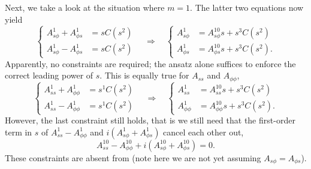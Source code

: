 Next, we take a look at the situation where $m=1$. The latter two equations now yield
\[
\left\{\begin{aligned}
    A_{s\phi}^1 + A_{\phi s}^1 &= s C(s^2) \\ 
    A_{s\phi}^1 - A_{\phi s}^1 &= s C(s^2)
\end{aligned}\right. \quad \Longrightarrow\quad 
\left\{\begin{aligned}
    A_{s\phi}^1 &= A_{s\phi}^{10} s + s^{3} C(s^2) \\ 
    A_{\phi s}^1 &= A_{\phi s}^{10} s + s^{3} C(s^2). 
\end{aligned}\right.
\]
Apparently, no constraints are required; the ansatz alone suffices to enforce the correct leading power of $s$. This is equally true for $A_{ss}$ and $A_{\phi\phi}$,
\[
\left\{\begin{aligned}
    A_{ss}^1 + A_{\phi \phi}^1 &= s^{1} C(s^2) \\ 
    A_{ss}^1 - A_{\phi \phi}^1 &= s^{1} C(s^2)
\end{aligned}\right. \quad \Longrightarrow\quad 
\left\{\begin{aligned}
    A_{ss}^1 &= A_{ss}^{10} s + s^{3} C(s^2) \\ 
    A_{\phi \phi}^1 &= A_{\phi\phi}^{10} s + s^{3} C(s^2) .
\end{aligned}\right.
\]
However, the last constraint still holds, that is we still need that the first-order term in $s$ of $A_{ss}^1 - A_{\phi\phi}^1$ and $i \left(A_{s\phi}^1 + A_{\phi s}^1\right)$ cancel each other out,
\[
    A_{ss}^{10} - A_{\phi\phi}^{10} + i \left(A_{s\phi}^{10} + A_{\phi s}^{10}\right) = 0.
\]
These constraints are absent from \textcite{holdenried-chernoff_long_2021} (note here we are not yet assuming $A_{s\phi} = A_{\phi s}$).

